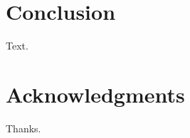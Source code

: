 \section{Conclusion}
Text.

\section*{Acknowledgments}
Thanks. 



\renewcommand{\thechapter}{\Roman{chapter}}